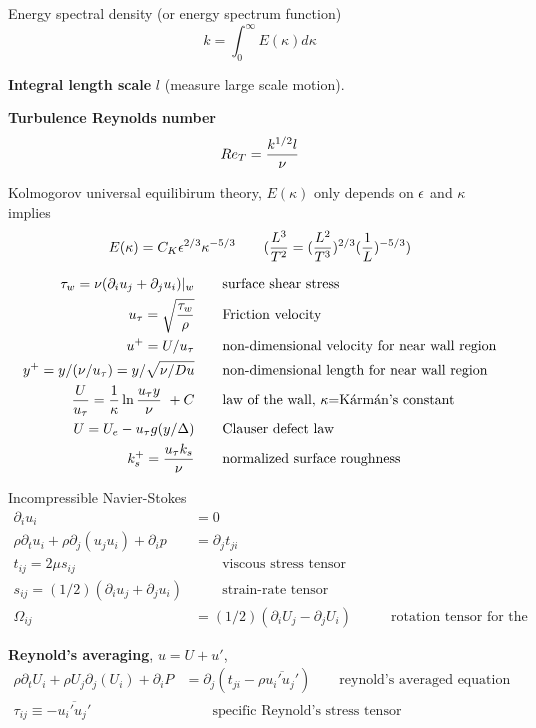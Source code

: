 \documentclass{article}
\begin{document}
Energy spectral density (or energy spectrum function)
\[
   k = \int_0^\infty E(\kappa) d\kappa
\]


{\bf Integral length scale}  $l$ (measure large scale motion).

{\bf Turbulence Reynolds number}
\[
     Re_{T} = {k^{1/2} l \over \nu}
\]

Kolmogorov universal equilibirum theory, $E(\kappa)$ only depends on $\epsilon$ and $\kappa$ implies
\[
   E(\kappa) = C_K \epsilon^{2/3} \kappa^{-5/3} \qquad ( {L^3\over T^2} = ({L^2\over T^3})^{2/3} ({1\over L})^{-5/3} )
\]


\begin{align*}
     \tau_w = \nu ( \partial_i u_j + \partial_j u_i ) |_{w} &\qquad \mbox{surface shear stress} \\
     u_\tau = \sqrt{ \tau_w \over \rho }  &\qquad  \mbox{Friction velocity} \\
     u^+ = U/u_\tau    & \qquad \mbox{non-dimensional velocity for near wall region} \\
     y^+ = y/(\nu/u_\tau) = y / \sqrt{ \nu/Du }  & \qquad \mbox{non-dimensional length for near wall region} \\
  {U\over u_\tau} = {1\over\kappa} \ln {u_\tau y\over\nu} ~+C &\qquad 
             \mbox{law of the wall, $\kappa$=K\'arm\'an's constant} \\
  U = U_e - u_\tau g( y/\Delta) & \qquad \mbox{Clauser defect law} \\
  k_s^+ = {u_\tau k_s \over \nu} &\qquad \mbox{normalized surface roughness}
\end{align*}

Incompressible Navier-Stokes
\begin{align*}
  \partial_i u_i &= 0 \\
  \rho \partial_t u_i + \rho \partial_j( u_j u_i) + \partial_i p &= \partial_j t_{ji} \\
  t_{ij} = 2 \mu s_{ij} & \qquad\mbox{viscous stress tensor} \\
  s_{ij} = (1/2) ( \partial_i u_j + \partial_j u_i ) & \qquad\mbox{strain-rate tensor} \\
\Omega_{ij} &= (1/2) ( \partial_i U_j - \partial_j U_i ) & \qquad\mbox{rotation tensor for the mean flow}
\end{align*}

{\bf Reynold's averaging}, $u = U + u'$,
\begin{align*}
   \rho \partial_t U_i + \rho U_j \partial_j(U_i) + \partial_i P &= \partial_j( t_{ji} - \rho \overline{u_i'u_j'})
     \qquad\mbox{reynold's averaged equation}\\
   \tau_{ij} \equiv  - \overline{u_i'u_j'} &  \qquad\mbox{specific Reynold's stress tensor}
\end{align*}
\end{document}

